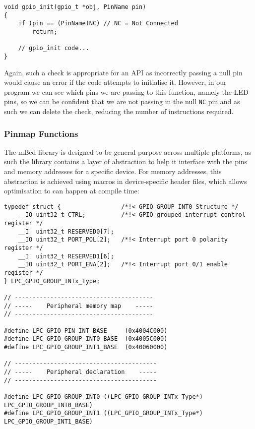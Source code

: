 \begin{lstlisting}[caption={Argument Guards of gpio init}]
void gpio_init(gpio_t *obj, PinName pin)
{
    if (pin == (PinName)NC) // NC = Not Connected
        return;

    // gpio_init code...
}
\end{lstlisting}

Again, such a check is appropriate for an API as incorrectly passing a null pin would cause an error if the code attempts to initialise it. However, in our program we can see which pins we are passing to this function, namely the LED pins, so we can be confident that we are not passing in the null \verb|NC| pin and as such we can delete the check, reducing the number of instructions required.

\subsubsection{Pinmap Functions}

The mBed library is designed to be general purpose across multiple platforms, as such the library contains a layer of abstraction to help it interface with the pins and memory addresses for a specific device. For memory addresses, this abstraction is achieved using macros in device-specific header files, which allows optimisation to can happen at compile time:

\begin{lstlisting}[caption={Memory spaces mapped in LPC11Uxx.h}]
typedef struct {                 /*!< GPIO_GROUP_INT0 Structure */
    __IO uint32_t CTRL;          /*!< GPIO grouped interrupt control register */
    __I  uint32_t RESERVED0[7];
    __IO uint32_t PORT_POL[2];   /*!< Interrupt port 0 polarity register */
    __I  uint32_t RESERVED1[6];
    __IO uint32_t PORT_ENA[2];   /*!< Interrupt port 0/1 enable register */
} LPC_GPIO_GROUP_INTx_Type;

// ---------------------------------------
// -----    Peripheral memory map    -----
// ---------------------------------------

#define LPC_GPIO_PIN_INT_BASE     (0x4004C000)
#define LPC_GPIO_GROUP_INT0_BASE  (0x4005C000)
#define LPC_GPIO_GROUP_INT1_BASE  (0x40060000)

// ----------------------------------------
// -----    Peripheral declaration    -----
// ----------------------------------------

#define LPC_GPIO_GROUP_INT0 ((LPC_GPIO_GROUP_INTx_Type*) LPC_GPIO_GROUP_INT0_BASE)
#define LPC_GPIO_GROUP_INT1 ((LPC_GPIO_GROUP_INTx_Type*) LPC_GPIO_GROUP_INT1_BASE)
\end{lstlisting}

